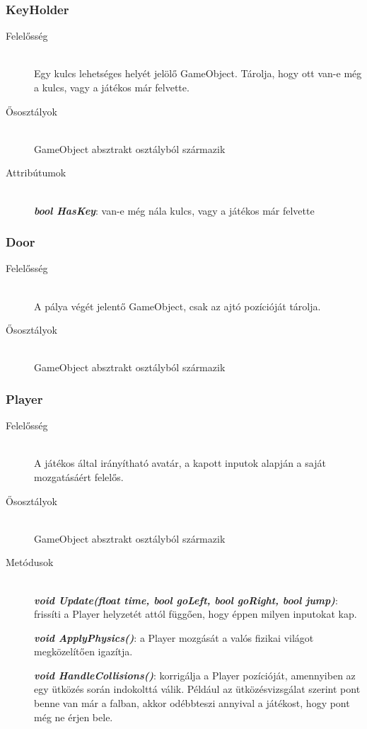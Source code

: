 \subsubsection{KeyHolder}
	\begin{description}
		\item[Felelősség] \hfill \\
		Egy kulcs lehetséges helyét jelölő GameObject. Tárolja, hogy ott van-e még a kulcs, vagy a játékos már felvette.
		
		\item[Ősosztályok]\hfill \\
		GameObject absztrakt osztályból származik
		
		\item[Attribútumok]\hfill \\
		\textbf{\emph{bool HasKey}}: van-e még nála kulcs, vagy a játékos már felvette
						
	\end{description}
	
\subsubsection{Door}
	\begin{description}
		\item[Felelősség] \hfill \\
		A pálya végét jelentő GameObject, csak az ajtó pozícióját tárolja.
		
		\item[Ősosztályok]\hfill \\
		GameObject absztrakt osztályból származik
						
	\end{description}
	
\subsubsection{Player}
	\begin{description}
		\item[Felelősség] \hfill \\
		A játékos által irányítható avatár, a kapott inputok alapján a saját mozgatásáért felelős.
		
		\item[Ősosztályok]\hfill \\
		GameObject absztrakt osztályból származik
		
		\item[Metódusok]\hfill \\
		\textbf{\emph{void Update(float time, bool goLeft, bool goRight, bool jump)}}: frissíti a Player helyzetét attól függően, hogy éppen milyen inputokat kap.
		
		\textbf{\emph{void ApplyPhysics()}}: a Player mozgását a valós fizikai világot megközelítően igazítja.
				
		\textbf{\emph{void HandleCollisions()}}: korrigálja a Player pozícióját, amennyiben az egy ütközés során indokolttá válik. Például az ütközésvizsgálat szerint pont benne van már a falban, akkor odébbteszi annyival a játékost, hogy pont még ne érjen bele.
						
	\end{description}
	
